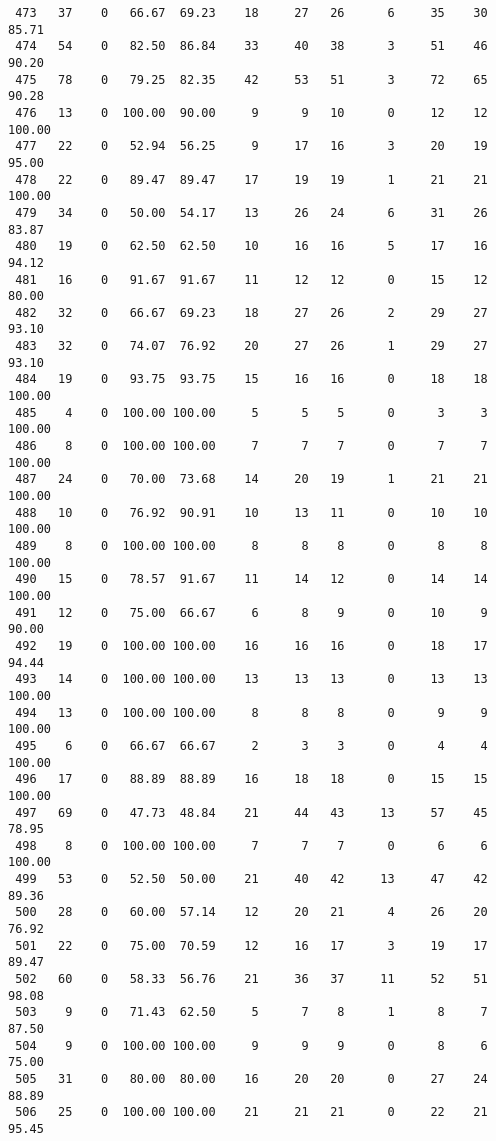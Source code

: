 \begin{verbatim}
 473   37    0   66.67  69.23    18     27   26      6     35    30    85.71
 474   54    0   82.50  86.84    33     40   38      3     51    46    90.20
 475   78    0   79.25  82.35    42     53   51      3     72    65    90.28
 476   13    0  100.00  90.00     9      9   10      0     12    12   100.00
 477   22    0   52.94  56.25     9     17   16      3     20    19    95.00
 478   22    0   89.47  89.47    17     19   19      1     21    21   100.00
 479   34    0   50.00  54.17    13     26   24      6     31    26    83.87
 480   19    0   62.50  62.50    10     16   16      5     17    16    94.12
 481   16    0   91.67  91.67    11     12   12      0     15    12    80.00
 482   32    0   66.67  69.23    18     27   26      2     29    27    93.10
 483   32    0   74.07  76.92    20     27   26      1     29    27    93.10
 484   19    0   93.75  93.75    15     16   16      0     18    18   100.00
 485    4    0  100.00 100.00     5      5    5      0      3     3   100.00
 486    8    0  100.00 100.00     7      7    7      0      7     7   100.00
 487   24    0   70.00  73.68    14     20   19      1     21    21   100.00
 488   10    0   76.92  90.91    10     13   11      0     10    10   100.00
 489    8    0  100.00 100.00     8      8    8      0      8     8   100.00
 490   15    0   78.57  91.67    11     14   12      0     14    14   100.00
 491   12    0   75.00  66.67     6      8    9      0     10     9    90.00
 492   19    0  100.00 100.00    16     16   16      0     18    17    94.44
 493   14    0  100.00 100.00    13     13   13      0     13    13   100.00
 494   13    0  100.00 100.00     8      8    8      0      9     9   100.00
 495    6    0   66.67  66.67     2      3    3      0      4     4   100.00
 496   17    0   88.89  88.89    16     18   18      0     15    15   100.00
 497   69    0   47.73  48.84    21     44   43     13     57    45    78.95
 498    8    0  100.00 100.00     7      7    7      0      6     6   100.00
 499   53    0   52.50  50.00    21     40   42     13     47    42    89.36
 500   28    0   60.00  57.14    12     20   21      4     26    20    76.92
 501   22    0   75.00  70.59    12     16   17      3     19    17    89.47
 502   60    0   58.33  56.76    21     36   37     11     52    51    98.08
 503    9    0   71.43  62.50     5      7    8      1      8     7    87.50
 504    9    0  100.00 100.00     9      9    9      0      8     6    75.00
 505   31    0   80.00  80.00    16     20   20      0     27    24    88.89
 506   25    0  100.00 100.00    21     21   21      0     22    21    95.45

\end{verbatim}

